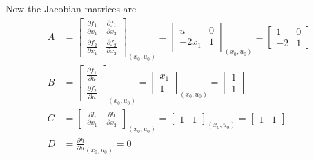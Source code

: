\documentclass[12pt]{article}
\begin{document}
Now the Jacobian matrices are
\begin{align*}
    A &= \begin{bmatrix}
        \frac{\partial f_1}{\partial x_1} & \frac{\partial f_1}{\partial x_2}\\ 
        \frac{\partial f_2}{\partial x_1} & \frac{\partial f_2}{\partial x_2}
    \end{bmatrix}_{(x_0, u_0)} = \begin{bmatrix}
        u & 0\\ 
        -2x_1 & 1
    \end{bmatrix}_{(x_0, u_0)} = \begin{bmatrix}
        1 & 0\\ 
        -2 & 1
    \end{bmatrix}\\
    B &= \begin{bmatrix}
        \frac{\partial f_1}{\partial u}\\ 
        \frac{\partial f_2}{\partial u}
    \end{bmatrix}_{(x_0, u_0)} = \begin{bmatrix}
        x_1\\ 
        1
    \end{bmatrix}_{(x_0, u_0)} = \begin{bmatrix}
        1\\ 
        1
    \end{bmatrix}\\
    C &= \begin{bmatrix}
        \frac{\partial h}{\partial x_1} & \frac{\partial h  }{\partial x_2}
    \end{bmatrix}_{(x_0, u_0)} = \begin{bmatrix}
        1 & 1  
    \end{bmatrix}_{(x_0, u_0)} = \begin{bmatrix}
        1 & 1
    \end{bmatrix}\\
    D &= \frac{\partial h}{\partial u}_{(x_0, u_0)} = 0  
\end{align*}
\end{document}
